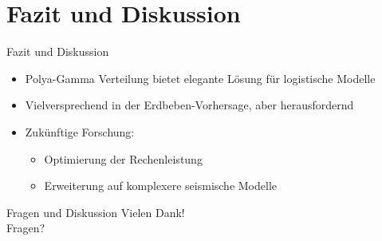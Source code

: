 \documentclass{beamer}
\begin{document}
\section{Fazit und Diskussion}
\begin{frame}{Fazit und Diskussion}
  \begin{itemize}
    \item Polya-Gamma Verteilung bietet elegante Lösung für logistische Modelle
    \item Vielversprechend in der Erdbeben-Vorhersage, aber herausfordernd
    \item Zukünftige Forschung:
    \begin{itemize}
      \item Optimierung der Rechenleistung
      \item Erweiterung auf komplexere seismische Modelle
    \end{itemize}
  \end{itemize}
\end{frame}

\begin{frame}{Fragen und Diskussion}
  \centering
  \Huge{Vielen Dank! \\ Fragen?}
\end{frame}
\end{document}

